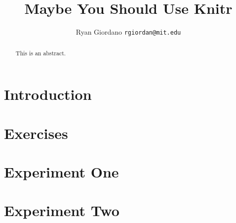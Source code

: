 \documentclass[11pt]{article}
\begin{document}
\title{Maybe You Should Use Knitr}

\author{Ryan Giordano \texttt{rgiordan@mit.edu}}

\maketitle

\begin{abstract}
This is an abstract.
\end{abstract}

\section{Introduction}



\section{Exercises}


\section{Experiment One}


\section{Experiment Two}



\end{document}
